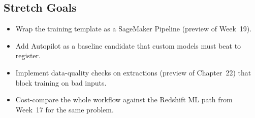 \subsection*{Stretch Goals}
\begin{itemize}
    \item Wrap the training template as a SageMaker Pipeline (preview of Week~19).
    \item Add Autopilot as a baseline candidate that custom models must beat to register.
    \item Implement data-quality checks on extractions (preview of Chapter~22) that block training on bad inputs.
    \item Cost-compare the whole workflow against the Redshift ML path from Week~17 for the same problem.
\end{itemize}
